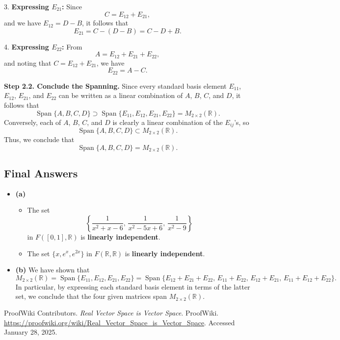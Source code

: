 \documentclass[12pt]{article}
\begin{document}
3. \textbf{Expressing \(E_{21}\):}  
Since
\[
C = E_{12}+E_{21},
\]
and we have \(E_{12}=D-B\), it follows that
\[
E_{21} = C - (D-B) = C - D + B.
\]

\medskip

4. \textbf{Expressing \(E_{22}\):}  
From
\[
A = E_{12}+E_{21}+E_{22},
\]
and noting that \(C = E_{12}+E_{21}\), we have
\[
E_{22} = A - C.
\]

\medskip

\textbf{Step 2.2. Conclude the Spanning.}  
Since every standard basis element \(E_{11}\), \(E_{12}\), \(E_{21}\), and \(E_{22}\) can be written as a linear combination of \(A\), \(B\), \(C\), and \(D\), it follows that
\[
\operatorname{Span}\{A,B,C,D\} \supset \operatorname{Span}\{E_{11},E_{12},E_{21},E_{22}\} = M_{2\times 2}(\mathbb{R}).
\]
Conversely, each of \(A\), \(B\), \(C\), and \(D\) is clearly a linear combination of the \(E_{ij}\)'s, so
\[
\operatorname{Span}\{A,B,C,D\} \subset M_{2\times 2}(\mathbb{R}).
\]
Thus, we conclude that
\[
\operatorname{Span}\{A,B,C,D\} = M_{2\times 2}(\mathbb{R}).
\]

\bigskip

\subsection*{Final Answers}

\begin{itemize}
    \item \textbf{(a)} 
    \begin{itemize}
        \item The set 
        \[
        \left\{\frac{1}{x^2+x-6},\, \frac{1}{x^2-5x+6},\, \frac{1}{x^2-9}\right\}
        \]
        in \(F([0,1],\mathbb{R})\) is \textbf{linearly independent}.
        \item The set \(\{x, e^x, e^{2x}\}\) in \(F(\mathbb{R},\mathbb{R})\) is \textbf{linearly independent}.
    \end{itemize}
    
    \item \textbf{(b)}  
    We have shown that
    \[
    M_{2\times 2}(\mathbb{R}) = \operatorname{Span}\{E_{11},E_{12},E_{21},E_{22}\} = \operatorname{Span}\{E_{12}+E_{21}+E_{22},\, E_{11}+E_{22},\, E_{12}+E_{21},\, E_{11}+E_{12}+E_{22}\}.
    \]
    In particular, by expressing each standard basis element in terms of the latter set, we conclude that the four given matrices span \(M_{2\times 2}(\mathbb{R})\).
\end{itemize}

\vspace{3in}

\begin{thebibliography}{9}
ProofWiki Contributors. \textit{Real Vector Space is Vector Space}. ProofWiki. \url{https://proofwiki.org/wiki/Real_Vector_Space_is_Vector_Space}. Accessed January 28, 2025.

\end{thebibliography}
\end{document}

